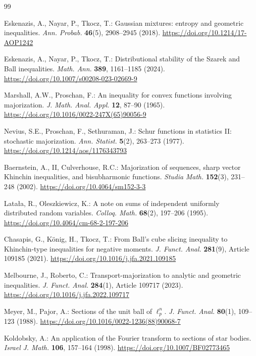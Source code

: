 \documentclass[pdflatex,sn-mathphys-num]{sn-jnl}
\numberwithin{equation}{section}
\theoremstyle{thmstyleone}
\theoremstyle{thmstylethree}
\newcommand{\1}{\mathbf{1}}
\begin{document}
\begin{thebibliography}{99}

Eskenazis, A., Nayar, P., Tkocz, T.:
Gaussian mixtures: entropy and geometric inequalities.
\emph{Ann. Probab.} \textbf{46}(5), 2908--2945 (2018).
\url{https://doi.org/10.1214/17-AOP1242}

Eskenazis, A., Nayar, P., Tkocz, T.:
Distributional stability of the Szarek and Ball inequalities.
\emph{Math. Ann.} \textbf{389}, 1161--1185 (2024).
\url{https://doi.org/10.1007/s00208-023-02669-9}

Marshall, A.W., Proschan, F.:
An inequality for convex functions involving majorization.
\emph{J. Math. Anal. Appl.} \textbf{12}, 87--90 (1965).
\url{https://doi.org/10.1016/0022-247X(65)90056-9}

Nevius, S.E., Proschan, F., Sethuraman, J.:
Schur functions in statistics II: stochastic majorization.
\emph{Ann. Statist.} \textbf{5}(2), 263--273 (1977).
\url{https://doi.org/10.1214/aos/1176343793}

Baernstein, A., II, Culverhouse, R.C.:
Majorization of sequences, sharp vector Khinchin inequalities,
and bisubharmonic functions.
\emph{Studia Math.} \textbf{152}(3), 231--248 (2002).
\url{https://doi.org/10.4064/sm152-3-3}

Lata{\l}a, R., Oleszkiewicz, K.:
A note on sums of independent uniformly distributed random variables.
\emph{Colloq. Math.} \textbf{68}(2), 197--206 (1995).
\url{https://doi.org/10.4064/cm-68-2-197-206}

Chasapis, G., K{\"o}nig, H., Tkocz, T.:
From Ball's cube slicing inequality to Khinchin-type inequalities
for negative moments.
\emph{J. Funct. Anal.} \textbf{281}(9), Article 109185 (2021).
\url{https://doi.org/10.1016/j.jfa.2021.109185}

Melbourne, J., Roberto, C.:
Transport-majorization to analytic and geometric inequalities.
\emph{J. Funct. Anal.} \textbf{284}(1), Article 109717 (2023).
\url{https://doi.org/10.1016/j.jfa.2022.109717}

Meyer, M., Pajor, A.:
Sections of the unit ball of $\ell_p^n$.
\emph{J. Funct. Anal.} \textbf{80}(1), 109--123 (1988).
\url{https://doi.org/10.1016/0022-1236(88)90068-7}

Koldobsky, A.:
An application of the Fourier transform to sections of star bodies.
\emph{Israel J. Math.} \textbf{106}, 157--164 (1998).
\url{https://doi.org/10.1007/BF02773465}


\end{thebibliography}
\end{document}

